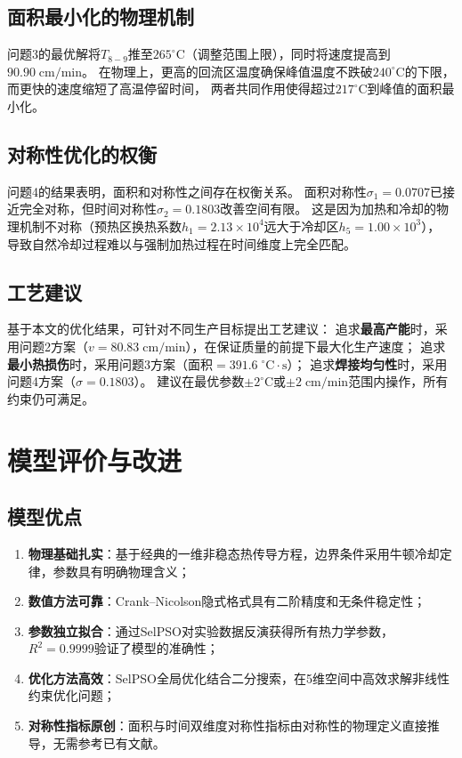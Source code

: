 \documentclass[12pt,a4paper]{ctexart}
\begin{document}
\subsection{面积最小化的物理机制}

问题3的最优解将$T_{8-9}$推至$265^{\circ}\mathrm{C}$（调整范围上限），同时将速度提高到$90.90\;\mathrm{cm/min}$。
在物理上，更高的回流区温度确保峰值温度不跌破$240^{\circ}\mathrm{C}$的下限，而更快的速度缩短了高温停留时间，
两者共同作用使得超过$217^{\circ}\mathrm{C}$到峰值的面积最小化。

\subsection{对称性优化的权衡}

问题4的结果表明，面积和对称性之间存在权衡关系。
面积对称性$\sigma_1=0.0707$已接近完全对称，但时间对称性$\sigma_2=0.1803$改善空间有限。
这是因为加热和冷却的物理机制不对称（预热区换热系数$h_1=2.13\times10^{4}$远大于冷却区$h_5=1.00\times10^{3}$），
导致自然冷却过程难以与强制加热过程在时间维度上完全匹配。

\subsection{工艺建议}

基于本文的优化结果，可针对不同生产目标提出工艺建议：
追求\textbf{最高产能}时，采用问题2方案（$v=80.83\;\mathrm{cm/min}$），在保证质量的前提下最大化生产速度；
追求\textbf{最小热损伤}时，采用问题3方案（面积$=391.6\;^{\circ}\mathrm{C}\!\cdot\!\mathrm{s}$）；
追求\textbf{焊接均匀性}时，采用问题4方案（$\sigma=0.1803$）。
建议在最优参数$\pm2^{\circ}\mathrm{C}$或$\pm2\;\mathrm{cm/min}$范围内操作，所有约束仍可满足。

\section{模型评价与改进}

\subsection{模型优点}

\begin{enumerate}[nosep]
    \item \textbf{物理基础扎实}：基于经典的一维非稳态热传导方程，边界条件采用牛顿冷却定律，参数具有明确物理含义；
    \item \textbf{数值方法可靠}：Crank--Nicolson隐式格式具有二阶精度和无条件稳定性；
    \item \textbf{参数独立拟合}：通过SelPSO对实验数据反演获得所有热力学参数，$R^2=0.9999$验证了模型的准确性；
    \item \textbf{优化方法高效}：SelPSO全局优化结合二分搜索，在5维空间中高效求解非线性约束优化问题；
    \item \textbf{对称性指标原创}：面积与时间双维度对称性指标由对称性的物理定义直接推导，无需参考已有文献。
\end{enumerate}
\end{document}
